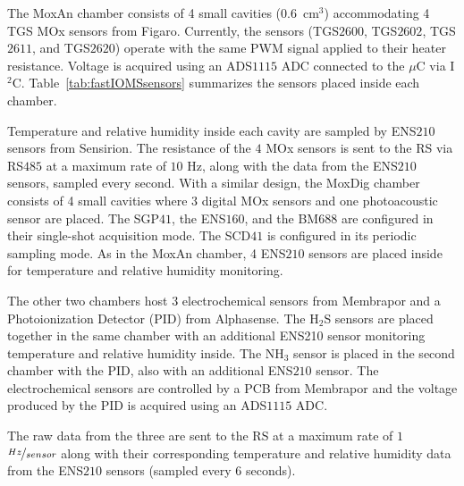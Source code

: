 \documentclass[lettersize,journal]{IEEEtran}
\begin{document}
The MoxAn chamber consists of 4 small cavities ($0.6$~cm$^{3}$) accommodating 4 TGS MOx sensors from Figaro. Currently, the sensors (TGS$2600$, TGS$2602$, TGS$2611$, and TGS$2620$) operate with the same PWM signal applied to their heater resistance. Voltage is acquired using an ADS$1115$ ADC connected to the $\mu$C via I$^{2}$C. Table~\ref{tab:fastIOMSsensors} summarizes the sensors placed inside each chamber.


Temperature and relative humidity inside each cavity are sampled by ENS$210$ sensors from Sensirion. The resistance of the $4$ MOx sensors is sent to the RS via RS$485$ at a maximum rate of $10$ Hz, along with the data from the ENS$210$ sensors, sampled every second.
With a similar design, the MoxDig chamber consists of 4 small cavities where $3$ digital MOx sensors and one photoacoustic sensor are placed. The SGP$41$, the ENS$160$, and the BM$688$ are configured in their single-shot acquisition mode. The SCD$41$ is configured in its periodic sampling mode.
As in the MoxAn chamber, 4 ENS$210$ sensors are placed inside for temperature and relative humidity monitoring. 

The other two chambers host $3$ electrochemical sensors from Membrapor and a Photoionization Detector (PID) from Alphasense. The H$_{2}$S sensors are placed together in the same chamber with an additional ENS210 sensor monitoring temperature and relative humidity inside. The NH$_{3}$ sensor is placed in the second chamber with the PID, also with an additional ENS$210$ sensor. The electrochemical sensors are controlled by a PCB from Membrapor and the voltage produced by the PID is acquired using an ADS$1115$ ADC. 

The raw data from the three  are sent to the RS at a maximum rate of $1$~$\nicefrac{Hz}{sensor}$ along with their corresponding temperature and relative humidity data from the ENS$210$ sensors (sampled every $6$ seconds).
\end{document}
